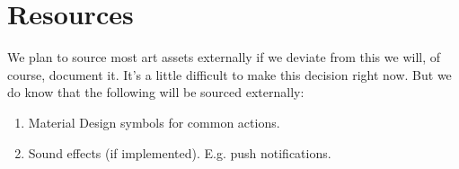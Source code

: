 \documentclass{article}
\begin{document}
\begin{center}
\end{center}

\section{Resources}

We plan to source most art assets externally if we deviate from this we will, of course, document it. It's a little difficult to make this decision right now. But we do know that the following will be sourced externally: 
\begin{enumerate}
    \item Material Design symbols for common actions.
    \item Sound effects (if implemented). E.g. push notifications.
\end{enumerate}
\end{document}
